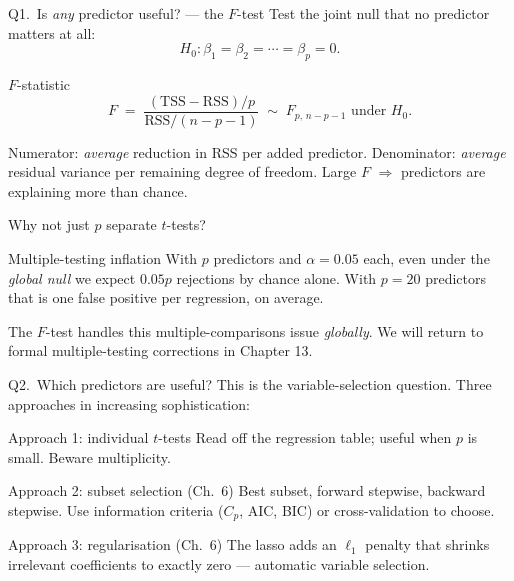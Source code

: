 \documentclass[aspectratio=169,11pt]{beamer}
\begin{document}
\begin{frame}{Q1.\ Is \emph{any} predictor useful? --- the $F$-test}
  Test the joint null that no predictor matters at all:
  \[
    H_0: \beta_1 = \beta_2 = \cdots = \beta_p = 0.
  \]
  \begin{block}{$F$-statistic}
    \[
      F \;=\; \frac{(\mathrm{TSS} - \mathrm{RSS})/p}
                   {\mathrm{RSS}/(n - p - 1)}
            \;\sim\; F_{p,\,n-p-1} \text{ under } H_0.
    \]
  \end{block}
  \begin{readme}
    Numerator: \emph{average} reduction in RSS per added predictor.
    Denominator: \emph{average} residual variance per remaining degree
    of freedom. Large $F$ $\Rightarrow$ predictors are explaining more
    than chance.
  \end{readme}
\end{frame}

\begin{frame}{Why not just $p$ separate $t$-tests?}
  \begin{alertblock}{Multiple-testing inflation}
    With $p$ predictors and $\alpha = 0.05$ each, even under the
    \emph{global null} we expect $0.05 p$ rejections by chance alone.
    With $p = 20$ predictors that is one false positive per
    regression, on average.
  \end{alertblock}
  \begin{takeaway}
    The $F$-test handles this multiple-comparisons issue
    \emph{globally}. We will return to formal multiple-testing
    corrections in Chapter 13.
  \end{takeaway}
\end{frame}

\begin{frame}{Q2.\ Which predictors are useful?}
  This is the variable-selection question. Three approaches in
  increasing sophistication:
  \begin{block}{Approach 1: individual $t$-tests}
    Read off the regression table; useful when $p$ is small. Beware
    multiplicity.
  \end{block}
  \begin{block}{Approach 2: subset selection (Ch.~6)}
    Best subset, forward stepwise, backward stepwise. Use information
    criteria ($C_p$, AIC, BIC) or cross-validation to choose.
  \end{block}
  \begin{block}{Approach 3: regularisation (Ch.~6)}
    The lasso adds an $\ell_1$ penalty that shrinks irrelevant
    coefficients to exactly zero --- automatic variable selection.
  \end{block}
\end{frame}
\end{document}
